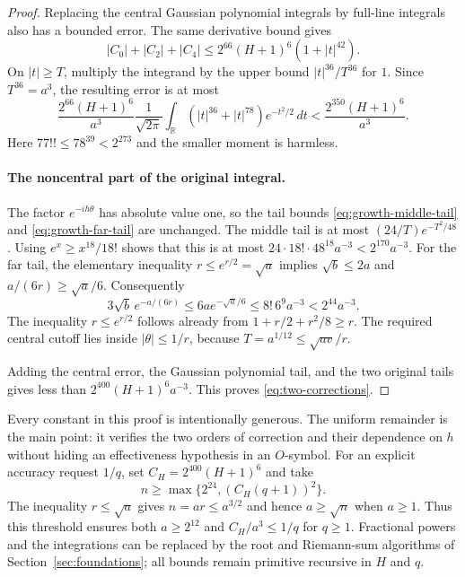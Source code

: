 \begin{proof}
Replacing the central Gaussian polynomial integrals by full-line integrals
also has a bounded error.  The same derivative bound gives
\[
 |C_0|+|C_2|+|C_4|
 \le2^{66}(H+1)^6(1+|t|^{42}).
\]
On $|t|\ge T$, multiply the integrand by the upper bound
$|t|^{36}/T^{36}$ for $1$.  Since $T^{36}=a^3$, the resulting error is at most
\[
 \frac{2^{66}(H+1)^6}{a^3}
  \frac1{\sqrt{2\pi}}
       \int_{\mathbb R}(|t|^{36}+|t|^{78})e^{-t^2/2}\,dt
 <\frac{2^{350}(H+1)^6}{a^3}.
\]
Here $77!!\le78^{39}<2^{273}$ and the smaller moment is harmless.

\paragraph{The noncentral part of the original integral.}
The factor $e^{-ih\theta}$ has absolute value one, so the tail bounds
\eqref{eq:growth-middle-tail} and \eqref{eq:growth-far-tail} are unchanged.
The middle tail is at most $(24/T)e^{-T^2/48}$.  Using
$e^x\ge x^{18}/18!$ shows that this is at most
$24\cdot18!\cdot48^{18}a^{-3}<2^{170}a^{-3}$.
For the far tail, the elementary inequality $r\le e^{r/2}=\sqrt a$
implies $\sqrt b\le2a$ and $a/(6r)\ge\sqrt a/6$.
Consequently
\[
 3\sqrt b\,e^{-a/(6r)}\le6a e^{-\sqrt a/6}
 \le 8!\,6^9 a^{-3}<2^{44}a^{-3}.
\]
The inequality $r\le e^{r/2}$ follows already from
$1+r/2+r^2/8\ge r$.  The required central cutoff lies inside
$|\theta|\le1/r$, because $T=a^{1/12}\le\sqrt{av}/r$.

Adding the central error, the Gaussian polynomial tail, and the two original
tails gives less than $2^{400}(H+1)^6a^{-3}$.
This proves \eqref{eq:two-corrections}.
\end{proof}

Every constant in this proof is intentionally generous.  The uniform
remainder is the main point: it verifies the two orders of correction and
their dependence on $h$ without hiding an effectiveness hypothesis in an
$O$-symbol.  For an explicit accuracy request $1/q$, set
$C_H=2^{400}(H+1)^6$ and take
\[
 n\ge\max\{2^{24},(C_H(q+1))^2\}.
\]
The inequality $r\le\sqrt a$ gives $n=ar\le a^{3/2}$ and hence
$a\ge\sqrt n$ when $a\ge1$.  Thus this threshold ensures both
$a\ge2^{12}$ and $C_H/a^3\le1/q$ for $q\ge1$.
Fractional powers and the integrations can be replaced by the root and
Riemann-sum algorithms of Section~\ref{sec:foundations}; all bounds remain
primitive recursive in $H$ and $q$.
